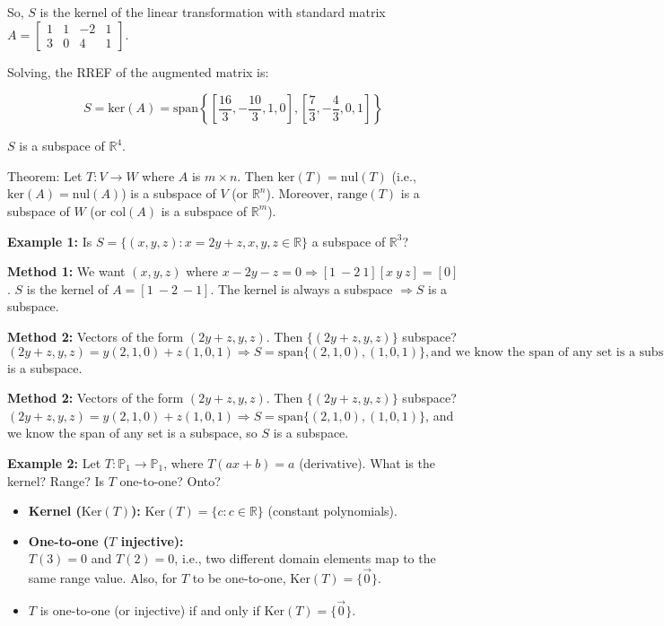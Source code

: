 \documentclass{article}
\begin{document}
So, \( S \) is the kernel of the linear transformation with standard matrix \( A = \begin{bmatrix} 1 & 1 & -2 & 1 \\ 3 & 0 & 4 & 1 \end{bmatrix} \).

Solving, the RREF of the augmented matrix is:

\[
S = \text{ker}(A) = \text{span} \left\{ \left[ \frac{16}{3}, -\frac{10}{3}, 1, 0 \right], \left[ \frac{7}{3}, -\frac{4}{3}, 0, 1 \right] \right\}
\]

\( S \) is a subspace of \( \mathbb{R}^4 \).

Theorem: Let \( T : V \rightarrow W \) where \( A \) is \( m \times n \). Then \( \text{ker}(T) = \text{nul}(T) \) (i.e., \( \text{ker}(A) = \text{nul}(A) \)) is a subspace of \( V \) (or \( \mathbb{R}^n \)). Moreover, \( \text{range}(T) \) is a subspace of \( W \) (or \( \text{col}(A) \) is a subspace of \( \mathbb{R}^m \)).


\textbf{Example 1:} Is \(S = \{(x,y,z) : x = 2y + z, x,y,z \in \mathbb{R}\}\) a subspace of \(\mathbb{R}^3\)?

\textbf{Method 1:} We want \((x,y,z)\) where \(x - 2y - z = 0 \Rightarrow [1\ -2\ 1] [x\ y\ z] = [0]\). \(S\) is the kernel of \(A = [1\ -2\ -1]\). The kernel is always a subspace $\Rightarrow S$ is a subspace.

\textbf{Method 2:} Vectors of the form \((2y+z, y, z)\). Then \(\{(2y+z, y, z)\}\) subspace? \( (2y+z, y, z) = y(2,1,0) + z(1,0,1) \Rightarrow S = \text{span}\{(2,1,0), (1,0,1)\}, \text{and we know the span of any set is a subspace, so S}\) is a subspace.

\textbf{Method 2:} Vectors of the form \((2y+z, y, z)\). Then \(\{(2y+z, y, z)\}\) subspace? 
\((2y+z, y, z) = y(2,1,0) + z(1,0,1) \Rightarrow S = \text{span}\{(2,1,0), (1,0,1)\}\), and we know the span of any set is a subspace, so \(S\) is a subspace.

\textbf{Example 2:} Let \(T : \mathbb{P}_1 \to \mathbb{P}_1\), where \(T(ax+b) = a\) (derivative). What is the kernel? Range? Is \(T\) one-to-one? Onto?

\begin{itemize}
    \item \textbf{Kernel (\( \text{Ker}(T) \)):} 
    \( \text{Ker}(T) = \{c : c \in \mathbb{R}\} \) (constant polynomials).
    
    \item \textbf{One-to-one (\( T \) injective):} \\
    \( T(3)=0 \) and \( T(2)=0 \), i.e., two different domain elements map to the same range value. Also, for \( T \) to be one-to-one, \( \text{Ker}(T) = \{\vec{0}\} \).
    
    \item  \( T \) is one-to-one (or injective) if and only if \( \text{Ker}(T) = \{\vec{0}\} \).

\end{itemize}
\end{document}

